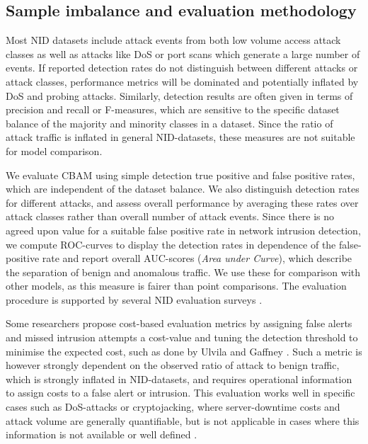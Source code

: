 \subsection{Sample imbalance and evaluation methodology}


Most NID datasets include attack events from both low volume access attack classes as well as attacks like DoS or port scans which generate a large number of events. 
If reported detection rates do not distinguish between different attacks or attack classes, performance metrics will be dominated and potentially inflated by DoS and probing attacks. 
Similarly, detection results are often given in terms of precision and recall or F-measures, which are sensitive to the specific dataset balance of the majority and minority classes in a dataset. Since the ratio of attack traffic is inflated in general NID-datasets, these measures are not suitable for model comparison. 

We evaluate CBAM using simple detection true positive and false positive rates, which are independent of the dataset balance. We also distinguish detection rates for different attacks, and assess overall performance by averaging these rates over attack classes rather than overall number of attack events. Since there is no agreed upon value for a suitable false positive rate in network intrusion detection, we compute ROC-curves to display the detection rates in dependence of the false-positive rate and report overall AUC-scores (\textit{Area under Curve}), which describe the separation of benign and anomalous traffic. We use these for comparison with other models, as this measure is fairer than point comparisons. The evaluation procedure is supported by several NID evaluation surveys \cite{ulvila2003evaluation,milenkoski2015evaluating}.

Some researchers propose cost-based evaluation metrics by assigning false alerts and missed intrusion attempts a cost-value and tuning the detection threshold to minimise the expected cost, such as done by Ulvila and Gaffney \cite{ulvila2003evaluation}. Such a metric is however strongly dependent on the observed ratio of attack to benign traffic, which is strongly inflated in NID-datasets, and requires operational information to assign costs to a false alert or intrusion. This evaluation works well in specific cases such as DoS-attacks or cryptojacking, where server-downtime costs and attack volume are generally quantifiable, but is not applicable in cases where this information is not available or well defined \cite{milenkoski2015evaluating}. 

